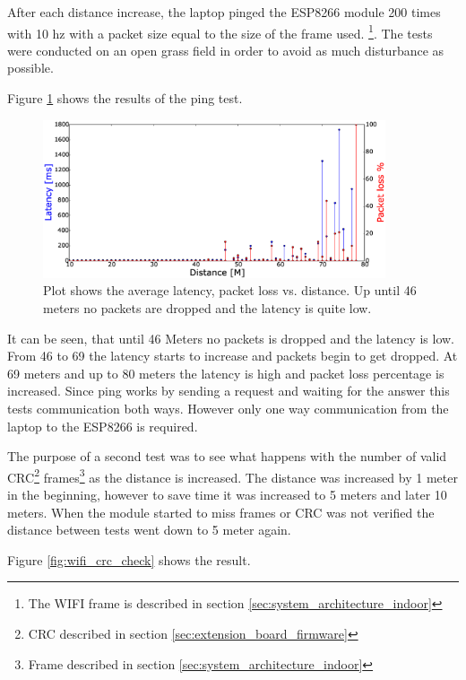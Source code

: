 After each distance increase, the laptop pinged the ESP8266 module 200 times with 10 hz with a packet size equal to the size of the frame used.
\footnote{The WIFI frame is described in section \ref{sec:system_architecture_indoor}}.
The tests were conducted on an open grass field in order to avoid as much disturbance as possible.
 
Figure \ref{fig:wifi_pingtest} shows the results of the ping test.

\begin{figure}[H]
    \center
    \includegraphics[width=0.9\textwidth]{graphics/wifi_test_latency_1.eps}
  \caption{Plot shows the average latency, packet loss vs. distance. Up until 46 meters no packets are dropped and the latency is quite low.}
    \label{fig:wifi_pingtest}
\end{figure}

It can be seen, that until 46 Meters no packets is dropped and the latency is low. From 46 to 69 the latency starts to increase and packets begin to get dropped. At 69 meters and up to 80 meters the latency is high and packet loss percentage is increased. Since ping works by sending a request and waiting for the answer this tests communication both ways. However only one way communication from the laptop to the ESP8266 is required.


The purpose of a second test was to see what happens with the number of valid CRC\footnote{CRC described in section \ref{sec:extension_board_firmware}} frames\footnote{Frame described in section \ref{sec:system_architecture_indoor}} as the distance is increased.
The distance was increased by 1 meter in the beginning, however to save time it was increased to 5 meters and later 10 meters. 
When the module started to miss frames or CRC was not verified the distance between tests went down to 5 meter again.

Figure \ref{fig:wifi_crc_check} shows the result.

